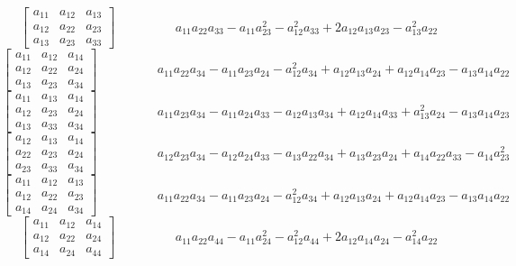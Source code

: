 
$$\left[\begin{matrix}a_{11} & a_{12} & a_{13}\\a_{12} & a_{22} & a_{23}\\a_{13} & a_{23} & a_{33}\end{matrix}\right]\hspace{2cm} a_{11} a_{22} a_{33} - a_{11} a_{23}^{2} - a_{12}^{2} a_{33} + 2 a_{12} a_{13} a_{23} - a_{13}^{2} a_{22}$$   
$$\left[\begin{matrix}a_{11} & a_{12} & a_{14}\\a_{12} & a_{22} & a_{24}\\a_{13} & a_{23} & a_{34}\end{matrix}\right]\hspace{2cm} a_{11} a_{22} a_{34} - a_{11} a_{23} a_{24} - a_{12}^{2} a_{34} + a_{12} a_{13} a_{24} + a_{12} a_{14} a_{23} - a_{13} a_{14} a_{22}$$   
$$\left[\begin{matrix}a_{11} & a_{13} & a_{14}\\a_{12} & a_{23} & a_{24}\\a_{13} & a_{33} & a_{34}\end{matrix}\right]\hspace{2cm} a_{11} a_{23} a_{34} - a_{11} a_{24} a_{33} - a_{12} a_{13} a_{34} + a_{12} a_{14} a_{33} + a_{13}^{2} a_{24} - a_{13} a_{14} a_{23}$$   
$$\left[\begin{matrix}a_{12} & a_{13} & a_{14}\\a_{22} & a_{23} & a_{24}\\a_{23} & a_{33} & a_{34}\end{matrix}\right]\hspace{2cm} a_{12} a_{23} a_{34} - a_{12} a_{24} a_{33} - a_{13} a_{22} a_{34} + a_{13} a_{23} a_{24} + a_{14} a_{22} a_{33} - a_{14} a_{23}^{2}$$   
$$\left[\begin{matrix}a_{11} & a_{12} & a_{13}\\a_{12} & a_{22} & a_{23}\\a_{14} & a_{24} & a_{34}\end{matrix}\right]\hspace{2cm} a_{11} a_{22} a_{34} - a_{11} a_{23} a_{24} - a_{12}^{2} a_{34} + a_{12} a_{13} a_{24} + a_{12} a_{14} a_{23} - a_{13} a_{14} a_{22}$$   
$$\left[\begin{matrix}a_{11} & a_{12} & a_{14}\\a_{12} & a_{22} & a_{24}\\a_{14} & a_{24} & a_{44}\end{matrix}\right]\hspace{2cm} a_{11} a_{22} a_{44} - a_{11} a_{24}^{2} - a_{12}^{2} a_{44} + 2 a_{12} a_{14} a_{24} - a_{14}^{2} a_{22}$$   
